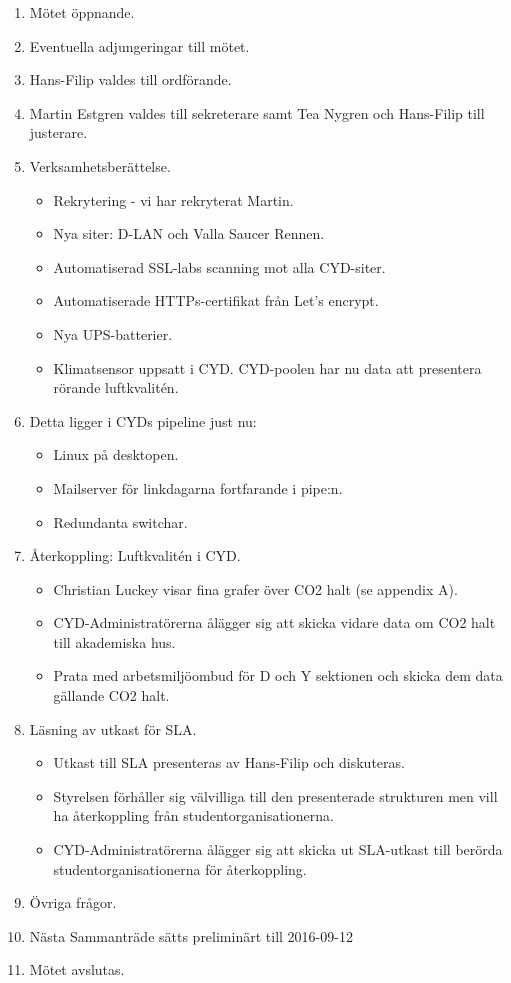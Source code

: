 \documentclass[a4paper,12pt]{article}
\begin{document}
\begin{enumerate}
\item Mötet öppnande.
\item Eventuella adjungeringar till mötet.
\item Hans-Filip valdes till ordförande.
\item Martin Estgren valdes till sekreterare samt Tea Nygren och Hans-Filip till justerare.
\item Verksamhetsberättelse.
\begin{itemize}
\item Rekrytering - vi har rekryterat Martin.
\item Nya siter: D-LAN och Valla Saucer Rennen.
\item Automatiserad SSL-labs scanning mot alla CYD-siter.
\item Automatiserade HTTPs-certifikat från Let's encrypt.
\item Nya UPS-batterier.
\item Klimatsensor uppsatt i CYD. CYD-poolen har nu data att presentera rörande luftkvalitén.
\end{itemize}
\newpage
\item Detta ligger i CYDs pipeline just nu:
\begin{itemize}
\item Linux på desktopen.
\item Mailserver för linkdagarna fortfarande i pipe:n.
\item Redundanta switchar.
\end{itemize}
\item Återkoppling: Luftkvalitén i CYD.
\begin{itemize}
\item Christian Luckey visar fina grafer över CO2 halt (se appendix A).
\item CYD-Administratörerna ålägger sig att skicka vidare data om CO2 halt till akademiska hus.
\item Prata med arbetsmiljöombud för D och Y sektionen och skicka dem data gällande CO2 halt.
\end{itemize}
\item Läsning av utkast för SLA.
\begin{itemize}
\item Utkast till SLA presenteras av Hans-Filip och diskuteras. 
\item Styrelsen förhåller sig välvilliga till den presenterade strukturen men vill ha återkoppling från studentorganisationerna. 
\item CYD-Administratörerna ålägger sig att skicka ut SLA-utkast till berörda studentorganisationerna för återkoppling.
\end{itemize}
\item Övriga frågor.
\item Nästa Sammanträde sätts preliminärt till 2016-09-12
\item Mötet avslutas.
\end{enumerate}
\end{document}
